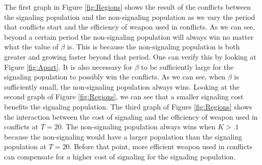 The first graph in Figure \ref{fig:Regions} shows the result of the conflicts between the signaling population and the non-signaling population as we vary the period that conflicts start and the efficiency of weapon used in conflicts. As we can see, beyond a certain period the non-signaling population will always win no matter what the value of $\beta$ is. This is because the  non-signaling population is both greater and growing faster beyond that period. One can verify this by looking at Figure \ref{fig:Apart}. It is also necessary for $\beta$ to be sufficiently large for the signaling population to possibly win the conflicts. As we can see, when $\beta$ is sufficiently small, the non-signaling population always wins. Looking at the second graph of Figure \ref{fig:Regions}, we can see that a smaller signaling cost benefits the signaling population. The third graph of Figure \ref{fig:Regions} shows the interaction between the cost of signaling and the efficiency of weapon used in conflicts at $T=20$. The non-signaling population always wins when $K>.1$ because the non-signaling would have a larger population than the signaling population at $T=20$. Before that point, more efficient weapon used in conflicts can compensate for a higher cost of signaling for the signaling population.  

